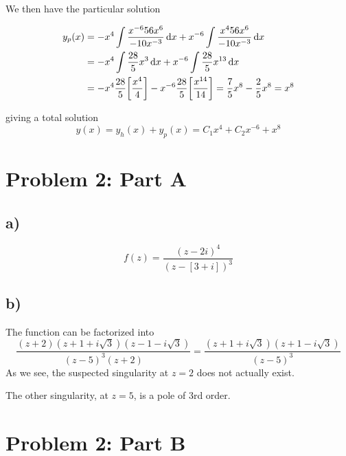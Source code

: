 \documentclass[10pt,a4paper]{article}
\begin{document}
We then have the particular solution

\begin{align}
    y_p(x) &= -x^4\int \frac{x^{-6}56x^6}{-10x^{-3}}\dd{x} + x^{-6} \int \frac{x^4 56 x^6}{-10x^{-3}} \dd{x} \\
    &= -x^4\int\frac{28}{5}x^3 \dd{x} + x^{-6} \int \frac{28}{5}x^{13} \dd{x} \\
    &= -x^4\frac{28}{5}\qty[\frac{x^4}{4}] - x^{-6}\frac{28}{5}\qty[\frac{x^{14}}{14}] = \frac{7}{5}x^8 - \frac{2}{5}x^8 = x^8
\end{align}

giving a total solution
\begin{equation}
    y(x) = y_h(x) + y_p(x) = C_1x^4 + C_2x^{-6} + x^8
\end{equation}




\section*{Problem 2: Part A}
\subsection*{a)}

\begin{equation}
    f(z) = \frac{(z-2i)^4}{(z-[3+i])^3}
\end{equation}


\subsection*{b)}
The function can be factorized into
\begin{equation}
    \frac{(z+2)(z+1+i\sqrt{3})(z-1-i\sqrt{3})}{(z-5)^3(z+2)} = \frac{(z+1+i\sqrt{3})(z+1-i\sqrt{3})}{(z-5)^3}
\end{equation}
As we see, the suspected singularity at $z=2$ does not actually exist.

The other singularity, at $z=5$, is a pole of 3rd order. 





\section*{Problem 2: Part B}
\end{document}
